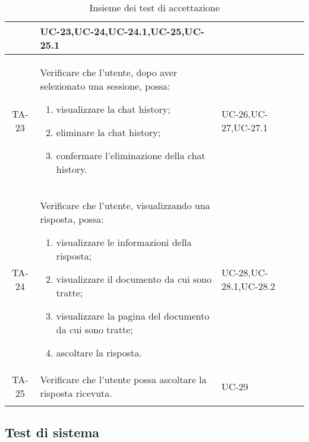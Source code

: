 \begin{xltabular}{\textwidth}{| c | X | X | c |}
\begin{enumerate}
    \end{enumerate}& UC-23,\newline UC-24,\newline UC-24.1,\newline UC-25,\newline UC-25.1 & \textcolor{cmarkcolor}{} \\
    \hline
    TA-23 & Verificare che l'utente, dopo aver selezionato una sessione, possa:
    \begin{enumerate}
        \item visualizzare la chat history;
        \item eliminare la chat history;
        \item confermare l'eliminazione della chat history.
    \end{enumerate}& UC-26,\newline UC-27,\newline UC-27.1 & \textcolor{cmarkcolor}{}  \\
    \hline
     TA-24 & Verificare che l'utente, visualizzando una risposta, possa:
    \begin{enumerate}
        \item visualizzare le informazioni della risposta;
        \item visualizzare il documento da cui sono tratte;
        \item visualizzare la pagina del documento da cui sono tratte;
        \item ascoltare la risposta.
    \end{enumerate}& UC-28,\newline UC-28.1,\newline UC-28.2 & \textcolor{cmarkcolor}{} \\
    \hline
    TA-25 & Verificare che l'utente possa ascoltare la risposta ricevuta.& UC-29 & \textcolor{xmarkcolor}{} \\
    \hline
     \caption{Insieme dei test di accettazione} 
\end{xltabular}
\endgroup

\newpage
\subsection{Test di sistema}

